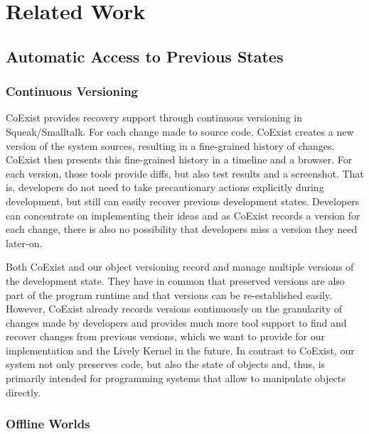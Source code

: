 \chapter{Related Work} \label{chapter:RELATED_WORK}



\section{Automatic Access to Previous States}



\subsection{Continuous Versioning}

\cite{Steinert2012COE}
CoExist provides recovery support through continuous versioning in Squeak/Smalltalk.
For each change made to source code, CoExist creates a new version of the system sources, resulting in a fine-grained history of changes.
CoExist then presents this fine-grained history in a timeline and a browser.
For each version, those tools provide diffs, but also test results and a screenshot.
That is, developers do not need to take precautionary actions explicitly during development, but still can easily recover previous development states.
Developers can concentrate on implementing their ideas and as CoExist records a version for each change, there is also no possibility that developers miss a version they need later-on.

Both CoExist and our object versioning record and manage multiple versions of the development state.
They have in common that preserved versions are also part of the program runtime and that versions can be re-established easily.
However, CoExist already records versions continuously on the granularity of changes made by developers and provides much more tool support to find and recover changes from previous versions, which we want to provide for our implementation and the Lively Kernel in the future.
In contrast to CoExist, our system not only preserves code, but also the state of objects and, thus, is primarily intended for programming systems that allow to manipulate objects directly.


\subsection{Offline Worlds}


